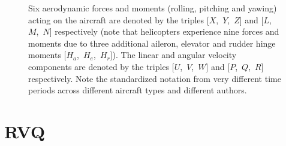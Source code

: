 \documentclass{article}
\begin{document}
\begin{figure}[t]
\center
{}
\hspace{0.5in}
\caption{Six aerodynamic forces and moments (rolling, pitching and yawing) acting on the aircraft are denoted by the triples [$X$,~$Y$,~$Z$] and [$L$,~$M$,~$N$] respectively (note that helicopters experience nine forces and moments due to three additional aileron, elevator and rudder hinge moments [$H_a$,~$H_e$,~$H_r$]).  The linear and angular velocity components are denoted by the triples [$U$,~$V$,~$W$] and [$P$,~$Q$,~$R$] respectively.  Note the standardized notation from very different time periods across different aircraft types and different authors.}   
\label{fig:notation}
\end{figure}




%

\section{RVQ}
\label{sec:types_VQ}
\end{document}
